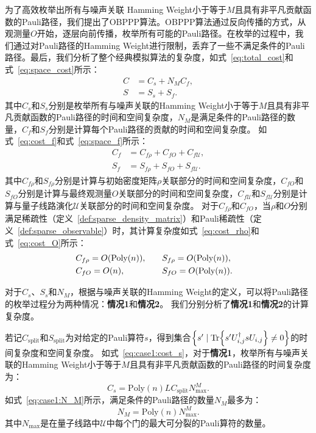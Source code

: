 为了高效枚举出所有与噪声关联 Hamming Weight小于等于$M$且具有非平凡贡献函数的Pauli路径，我们提出了OBPPP算法。OBPPP算法通过反向传播的方式，从观测量$O$开始，逐层向前传播，枚举所有可能的Pauli路径。在枚举的过程中，我们通过对Pauli路径的Hamming Weight进行限制，丢弃了一些不满足条件的Pauli路径。最后，我们分析了整个经典模拟算法的复杂度，如式~\eqref{eq:total_cost}和式~\eqref{eq:space_cost}所示：
\begin{equation*}
    \begin{aligned}
        C &= C_s+N_MC_f, \\
        S &= S_s+S_f.
    \end{aligned}
\end{equation*}
其中$C_s$和$S_s$分别是枚举所有与噪声关联的Hamming Weight小于等于$M$且具有非平凡贡献函数的Pauli路径的时间和空间复杂度，$N_M$是满足条件的Pauli路径的数量，$C_f$和$S_f$分别是计算每个Pauli路径的贡献的时间和空间复杂度。
如式~\eqref{eq:cost_f}和式~\eqref{eq:space_f}所示：
\begin{equation*}
    \begin{aligned}
        C_f &= C_{f\rho}+C_{fO}+C_{f\mathcal{U}},\\
        S_f &= S_{f\rho}+S_{fO}+S_{f\mathcal{U}}.
    \end{aligned}
\end{equation*}
其中$C_{f\rho}$和$S_{f\rho}$分别是计算与初始密度矩阵$\rho$关联部分的时间和空间复杂度，$C_{fO}$和$S_{fO}$分别是计算与最终观测量$O$关联部分的时间和空间复杂度，$C_{f\mathcal{U}}$和$S_{f\mathcal{U}}$分别是计算与量子线路演化$\mathcal{U}$关联部分的时间和空间复杂度。
对于$C_{f\rho}$和$C_{fO}$，当$\rho$和$O$分别满足稀疏性（定义~\ref{def:sparse_density_matrix}）和Pauli稀疏性（定义~\ref{def:sparse_observable}）时，其计算复杂度如式~\eqref{eq:cost_rho}和式~\eqref{eq:cost_O}所示：
\begin{equation*}
    \begin{aligned}
        &C_{f\rho}=O(\text{Poly}(n)),&\quad   &S_{f\rho}=O(\text{Poly}(n)),& \\
        &C_{fO}=O(n),&\quad  &S_{fO}=O(\text{Poly}(n)).&
    \end{aligned}
\end{equation*}


对于$C_s$、$S_s$和$N_M$，根据与噪声关联的Hamming Weight的定义，可以将Pauli路径的枚举过程分为两种情况：\textbf{情况1}和\textbf{情况2}。
我们分别分析了\textbf{情况1}和\textbf{情况2}的计算复杂度。

若记$C_{\text{split}}$和$S_{\text{split}}$为对给定的Pauli算符$s$，得到集合$\left\{ s'\mid \Tr{s' U^\dagger_{i,j}s U_{i,j}}\neq 0 \right\}$的时间复杂度和空间复杂度。
如式~\eqref{eq:case1:cost_s}，对于\textbf{情况1}，枚举所有与噪声关联的Hamming Weight小于等于$M$且具有非平凡贡献函数的Pauli路径的时间复杂度为：
\begin{equation*}
        C_s=\mathrm{Poly}(n) L C_{\text{split}} N_{\text{max}}^{M}.
\end{equation*}
如式~\eqref{eq:case1:N_M}所示，满足条件的Pauli路径的数量$N_M$最多为：
\begin{equation*}
    N_M=\mathrm{Poly}(n) N_{\text{max}}^{M}.
\end{equation*}
其中$N_{\text{max}}$是在量子线路中$\mathcal{U}$中每个门的最大可分裂的Pauli算符的数量。

